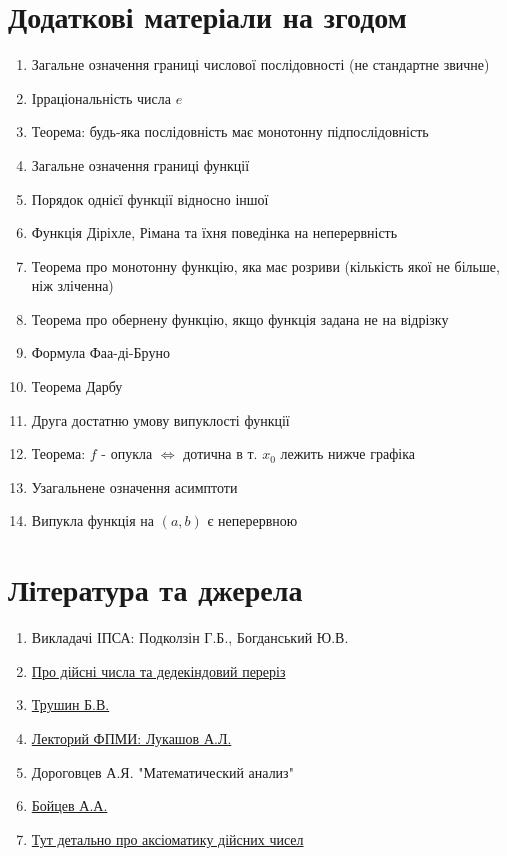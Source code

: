 \documentclass[a4paper, 14pt]{article}
\theoremstyle{theoremdd}
\theoremstyle{theoremdd}
\theoremstyle{theoremdd}
\theoremstyle{theoremdd}
\theoremstyle{theoremdd}
\theoremstyle{theoremdd}
\theoremstyle{theoremdd}
\theoremstyle{theoremdd}
\begin{document}
\section*{Додаткові матеріали на згодом}
\begin{enumerate}
\item Загальне означення границі числової послідовності (не стандартне звичне)
\item Ірраціональність числа $e$
\item Теорема: будь-яка послідовність має монотонну підпослідовність
\item Загальне означення границі функції
\item Порядок однієї функції відносно іншої
\item Функція Діріхле, Рімана та їхня поведінка на неперервність
\item Теорема про монотонну функцію, яка має розриви (кількість якої не більше, ніж зліченна)
\item Теорема про обернену функцію, якщо функція задана не на відрізку
\item Формула Фаа-ді-Бруно
\item Теорема Дарбу
\item Друга достатню умову випуклості функції
\item Теорема: $f$ - опукла $\iff$ дотична в т. $x_0$ лежить нижче графіка
\item Узагальнене означення асимптоти
\item Випукла функція на $(a,b)$ є неперервною
\end{enumerate}

\section*{Література та джерела}
\begin{enumerate}
\item Викладачі ІПСА: Подколзін Г.Б., Богданський Ю.В.
\item \href{https://www.math.brown.edu/reschwar/INF/handout3.pdf}{Про дійсні числа та дедекіндовий переріз}
\item \href{https://www.youtube.com/watch?v=6hwENpQqKP0&list=PL3BJnp-dNqazNc11qgguXNcJwCMqwK5Yv}{Трушин Б.В.}
\item \href{https://www.youtube.com/watch?v=SNq-NgYcqbY&list=PL4_hYwCyhAvZcIIZvqdQyyWx6naPeuj2W}{Лекторий ФПМИ: Лукашов А.Л.}
\item Дороговцев А.Я. "Математический анализ"
\item \href{https://www.youtube.com/watch?v=uOeZbCy6-xc&list=PLx5jwZiVE4CV0zwaZNJeL-m994o7eFbT2&index=1}{Бойцев А.А.}
\item \href{https://www3.nd.edu/~dgalvin1/10860/10860_S20/book/Sec3.pdf}{Тут детально про аксіоматику дійсних чисел}
\end{enumerate}
\end{document}
